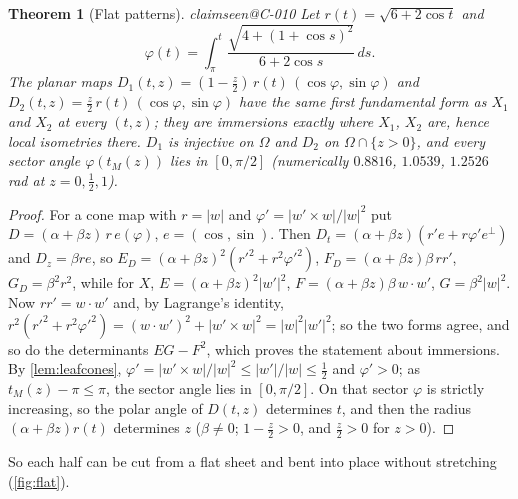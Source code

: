 \documentclass[11pt,a4paper]{article}
\makeatletter
\theoremstyle{plain}
\newtheorem{theorem}{Theorem}[section]
\theoremstyle{remark}
\newcommand{\claim}[1]{\ifcsname claimseen@#1\endcsname\else\expandafter\gdef\csname claimseen@#1\endcsname{}\label{claim:#1}\fi}
\makeatother
\begin{document}
\begin{theorem}[Flat patterns]\label{thm:flat}\claim{C-010}
Let $r(t)=\sqrt{6+2\cos t}$ and
\[ \varphi(t)=\int_\pi^t\frac{\sqrt{4+(1+\cos s)^2}}{6+2\cos s}\,ds. \]
The planar maps $D_1(t,z)=(1-\tfrac z2)\,r(t)\,(\cos\varphi,\sin\varphi)$ and $D_2(t,z)=\tfrac z2\,r(t)\,(\cos\varphi,\sin\varphi)$
have the same first fundamental form as $X_1$ and $X_2$ at every $(t,z)$; they are immersions exactly where $X_1$, $X_2$
are, hence local isometries there. $D_1$ is injective on $\Omega$ and $D_2$ on $\Omega\cap\{z>0\}$, and every sector angle
$\varphi(t_M(z))$ lies in $[0,\pi/2]$ (numerically $0.8816$, $1.0539$, $1.2526$ rad at $z=0,\tfrac12,1$).
\end{theorem}
\begin{proof}
For a cone map with $r=|w|$ and $\varphi'=|w'\times w|/|w|^2$ put $D=(\alpha+\beta z)\,r\,e(\varphi)$, $e=(\cos,\sin)$.
Then $D_t=(\alpha+\beta z)(r'e+r\varphi'e^\perp)$ and $D_z=\beta r e$, so
$E_D=(\alpha+\beta z)^2(r'^2+r^2\varphi'^2)$, $F_D=(\alpha+\beta z)\beta\,rr'$, $G_D=\beta^2r^2$, while for $X$,
$E=(\alpha+\beta z)^2|w'|^2$, $F=(\alpha+\beta z)\beta\,w\cdot w'$, $G=\beta^2|w|^2$. Now $rr'=w\cdot w'$ and, by
Lagrange's identity, $r^2(r'^2+r^2\varphi'^2)=(w\cdot w')^2+|w'\times w|^2=|w|^2|w'|^2$; so the two forms agree, and so do
the determinants $EG-F^2$, which proves the statement about immersions. By \cref{lem:leafcones},
$\varphi'=|w'\times w|/|w|^2\le |w'|/|w|\le\frac12$ and $\varphi'>0$; as $t_M(z)-\pi\le\pi$, the sector angle lies in
$[0,\pi/2]$. On that sector $\varphi$ is strictly increasing, so the polar angle of $D(t,z)$ determines $t$, and then the
radius $(\alpha+\beta z)r(t)$ determines $z$ ($\beta\ne0$; $1-\frac z2>0$, and $\frac z2>0$ for $z>0$).
\end{proof}

So each half can be cut from a flat sheet and bent into place without stretching (\cref{fig:flat}).
\end{document}
